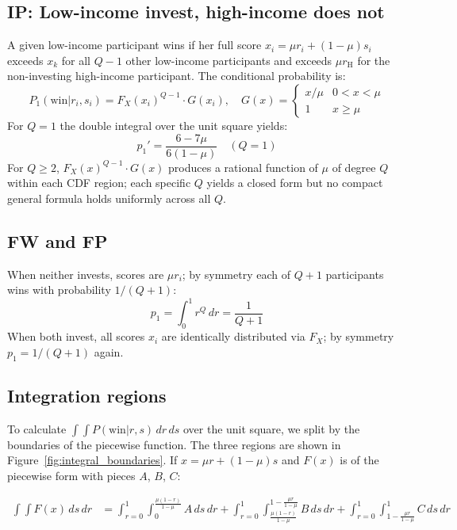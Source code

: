 \documentclass[
    oneside,
    fontsize=10pt,leqno]{article}
\begin{document}
\subsection*{IP: Low-income invest, high-income does not}

A given low-income participant wins if her full score
$x_i = \mu r_i + (1-\mu)s_i$ exceeds $x_k$ for all $Q-1$ other
low-income participants and exceeds $\mu r_{\text{H}}$ for the
non-investing high-income participant. The conditional probability is:
\[
P_1(\text{win}|r_i,s_i) = F_X(x_i)^{Q-1} \cdot G(x_i),
\quad G(x) = \begin{cases} x/\mu & 0 < x < \mu \\ 1 & x \geq \mu \end{cases}
\]
For $Q=1$ the double integral over the unit square yields:
\[
p_1' = \frac{6-7\mu}{6(1-\mu)} \quad (Q=1)
\]
For $Q \geq 2$, $F_X(x)^{Q-1} \cdot G(x)$ produces a rational
function of $\mu$ of degree $Q$ within each CDF region; each
specific $Q$ yields a closed form but no compact general formula
holds uniformly across all $Q$.

\subsection*{FW and FP}

When neither invests, scores are $\mu r_i$; by symmetry each of
$Q+1$ participants wins with probability $1/(Q+1)$:
\[
p_1 = \int_0^1 r^Q\,dr = \frac{1}{Q+1}
\]
When both invest, all scores $x_i$ are identically distributed via
$F_X$; by symmetry $p_1 = 1/(Q+1)$ again.

\subsection*{Integration regions}

To calculate $\int\!\!\int P(\text{win}|r,s)\,dr\,ds$
over the unit square, we split by the boundaries of the piecewise function.
The three regions are shown in Figure~\ref{fig:integral_boundaries}.
If $x=\mu r+(1-\mu)s$ and $F(x)$ is of the piecewise form with pieces $A$, $B$, $C$:

\begin{align*}
\int\!\!\int F(x)\,ds\,dr
 & =\int_{r=0}^{1}\!\int_{0}^{\frac{\mu(1-r)}{1-\mu}}\!\!A\,ds\,dr
 +\int_{r=0}^{1}\!\int_{\frac{\mu(1-r)}{1-\mu}}^{1-\frac{\mu r}{1-\mu}}\!\!B\,ds\,dr
 +\int_{r=0}^{1}\!\int_{1-\frac{\mu r}{1-\mu}}^{1}\!\!C\,ds\,dr
\end{align*}
\end{document}
